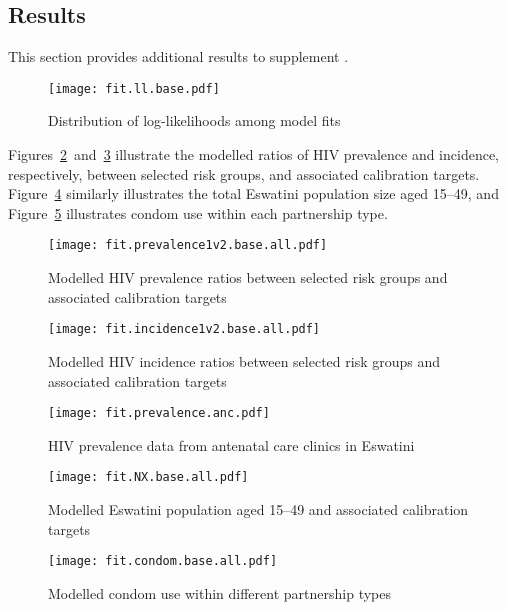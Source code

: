 \subsection{Results}\label{app.model.cal.res}
This section provides additional results to supplement .
\begin{figure}[h]
  \centering\texttt{[image: fit.ll.base.pdf]}
  \caption{Distribution of log-likelihoods among model fits}
  \label{fig:fit.ll}
\end{figure}
\par
Figures~\ref{fig:fit.prevalence1v2}~and~\ref{fig:fit.incidence1v2}
illustrate the modelled ratios of HIV prevalence and incidence, respectively,
between selected risk groups, and associated calibration targets.
Figure~\ref{fig:fit.pop} similarly illustrates the total Eswatini population size aged 15--49, and
Figure~\ref{fig:fit.condom} illustrates condom use within each partnership type.
\begin{figure}[h]
  \centering\texttt{[image: fit.prevalence1v2.base.all.pdf]}
  \caption{Modelled HIV prevalence ratios between selected risk groups
    and associated calibration targets}
  \label{fig:fit.prevalence1v2}
\end{figure}
\begin{figure}[h]
  \centering\texttt{[image: fit.incidence1v2.base.all.pdf]}
  \caption{Modelled HIV incidence ratios between selected risk groups
    and associated calibration targets}
  \label{fig:fit.incidence1v2}
\end{figure}
\begin{figure}[h]
  \begin{minipage}[t]{.54\linewidth}
    \centering\texttt{[image: fit.prevalence.anc.pdf]}
    \caption{HIV prevalence data from antenatal care clinics in Eswatini}
    \label{fig:fit.prevalence.anc}
  \end{minipage}\hfill
  \begin{minipage}[t]{.44\linewidth}
    \centering\texttt{[image: fit.NX.base.all.pdf]}
    \caption{Modelled Eswatini population aged 15--49
    and associated calibration targets}
    \label{fig:fit.pop}
  \end{minipage}
\end{figure}
\begin{figure}[h]
  \texttt{[image: fit.condom.base.all.pdf]}
  \caption{Modelled condom use within different partnership types}
  \label{fig:fit.condom}
\end{figure}
